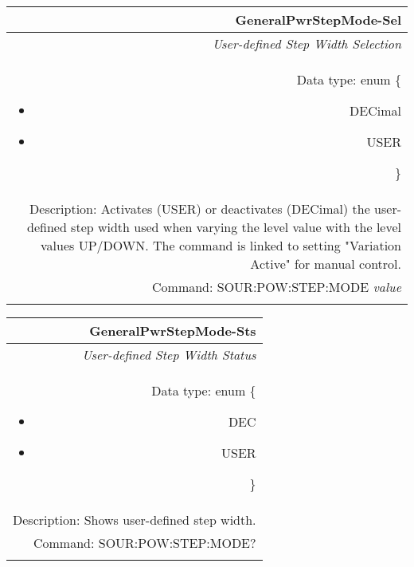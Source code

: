 \documentclass[openany]{article}
\begin{document}
		\begin{tabular}{N}
			\hline
			\bfseries GeneralPwrStepMode-Sel \\ \hline
			\emph{User-defined Step Width Selection} \\
			Data type: enum \{\begin{itemize}[noitemsep]
				\small
				\item[] DECimal
				\item[] USER
			\end{itemize}\} \\
			Description: Activates (USER) or deactivates (DECimal) the user-defined step width used when varying the level value with the level values UP/DOWN. The command is linked to setting "Variation Active" for manual control. \\
			Command: SOUR:POW:STEP:MODE \emph{value} \\
			\\

		\end{tabular}


		\begin{tabular}{N}
			\hline
			\bfseries GeneralPwrStepMode-Sts \\ \hline
			\emph{User-defined Step Width Status} \\
			Data type: enum \{\begin{itemize}[noitemsep]
				\small
				\item[] DEC
				\item[] USER
			\end{itemize}\} \\
			Description: Shows user-defined step width. \\
			Command: SOUR:POW:STEP:MODE? \\
			\\

		\end{tabular}
\end{document}
